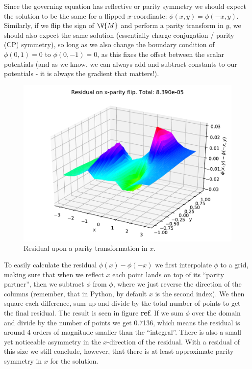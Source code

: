 \documentclass[sigconf]{acmart}
\begin{document}
Since the governing equation has reflective or parity symmetry we should expect the solution to be the same for a flipped $ x $-coordinate: $ \phi(x, y) = \phi(-x, y) $. Similarly, if we flip the sign of $ \V{M} $ and perform a parity transform in $ y $, we should also expect the same solution (essentially charge conjugation / parity (CP) symmetry), so long as we also change the boundary condition of $ \phi(0,1) =0 $ to $ \phi(0,-1)=0 $, as this fixes the offset between the scalar potentials (and as we know, we can always add and subtract constants to our potentials - it is always the gradient that matters!).
\begin{figure}
	\includegraphics[width=\linewidth]{ex_res_x.pdf}
	\caption{Residual upon a parity transformation in $ x $.}
	\label{fig:xres}
\end{figure}
To easily calculate the residual $ \phi(x)-\phi(-x) $ we first interpolate $ \phi $ to a grid, making sure that when we reflect $ x $ each point lands on top of its ``parity partner'', then we subtract $ \phi $ from $ \phi $, where we just reverse the direction of the columns (remember, that in Python, by default $ x $ is the second index). We then square each difference, sum up and divide by the total number of points to get the final residual. The result is seen in figure \textbf{ref}. If we sum $ \phi $ over the domain and divide by the number of points we get 0.7136, which means the residual is around 4 orders of magnitude smaller than the ``integral''. There is also a small yet noticeable asymmetry in the $ x $-direction of the residual. With a residual of this size we still conclude, however, that there is at least approximate parity symmetry in $ x $ for the solution.
\end{document}
